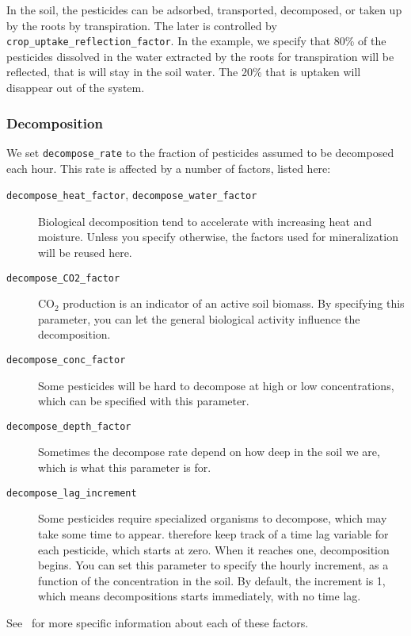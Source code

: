 \documentclass[a4paper,11pt]{article}
\begin{document}
In the soil, the pesticides can be adsorbed, transported, decomposed,
or taken up by the roots by transpiration.  The later is controlled by
\linebreak{}\texttt{crop\_uptake\_reflection\_factor}.  In the
example, we specify that 80\% of the pesticides dissolved in the water
extracted by the roots for transpiration will be reflected, that is
will stay in the soil water.  The 20\% that is uptaken will disappear
out of the system.

\subsubsection{Decomposition}

We set \texttt{decompose\_rate} to the fraction of pesticides assumed
to be decomposed each hour.  This rate is affected by a number of
factors, listed here:
\begin{description}
\item[\texttt{decompose\_heat\_factor},
  \texttt{decompose\_water\_factor}] Biological
  decomposition\linebreak{} tend to accelerate with increasing heat
  and moisture.  Unless you specify otherwise, the factors used for
  mineralization will be reused here.
\item[\texttt{decompose\_CO2\_factor}] CO$_2$ production is an
  indicator of an active soil biomass.  By specifying this parameter,
  you can let the general biological activity influence the
  decomposition. 
\item[\texttt{decompose\_conc\_factor}] Some pesticides will be hard
  to decompose at high or low concentrations, which can be specified
  with this parameter. 
\item[\texttt{decompose\_depth\_factor}] Sometimes the decompose rate
  depend on how deep in the soil we are, which is what this parameter
  is for. 
\item[\texttt{decompose\_lag\_increment}] Some pesticides require
  specialized organisms to decompose, which may take some time to
  appear.  \Daisy{} therefore keep track of a time lag variable for
  each pesticide, which starts at zero.  When it reaches one,
  decomposition begins.  You can set this parameter to specify the
  hourly increment, as a function of the concentration in the soil.
  By default, the increment is 1, which means decompositions starts
  immediately, with no time lag.
\end{description}
See~\cite{dina81} for more specific information about each of these
factors. 
\end{document}
